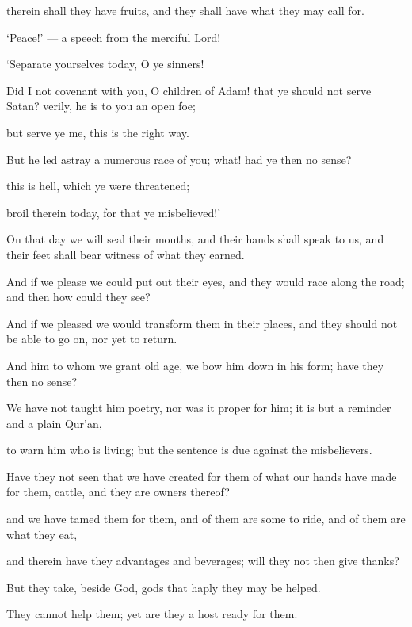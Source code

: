 \documentclass[fontsize=14pt, letterpaper, notitlepage, openany, DIV=12]{scrbook} %
\begin{document}
\noindent[36:57]
therein shall they have fruits, and they shall have what they may call for.

\noindent[36:58]
`Peace!' --- a speech from the merciful Lord!

\noindent[36:59]
`Separate yourselves today, O ye sinners!

\noindent[36:60]
Did I not covenant with you, O children of Adam! that ye should not serve Satan? verily,
he is to you an open foe;

\noindent[36:61]
but serve ye me, this is the right way.

\noindent[36:62]
But he led astray a numerous race of you; what! had ye then no sense?

\noindent[36:63]
this is hell, which ye were threatened;

\noindent[36:64]
broil therein today, for that ye misbelieved!'

\noindent[36:65]
On that day we will seal their mouths, and their hands shall speak to us, and their feet
shall bear witness of what they earned.

\noindent[36:66]
And if we please we could put out their eyes, and they would race along the road; and
then how could they see?

\noindent[36:67]
And if we pleased we would transform them in their places, and they should not be able
to go on, nor yet to return.

\noindent[36:68]
And him to whom we grant old age, we bow him down in his form; have they then no
sense?

\noindent[36:69]
We have not taught him poetry, nor was it proper for him; it is but a reminder and a plain
Qur'an,

\noindent[36:70]
to warn him who is living; but the sentence is due against the misbelievers.

\noindent[36:71]
Have they not seen that we have created for them of what our hands have made for them,
cattle, and they are owners thereof?

\noindent[36:72]
and we have tamed them for them, and of them are some to ride, and of them are what
they eat,

\noindent[36:73]
and therein have they advantages and beverages; will they not then give thanks?

\noindent[36:74]
But they take, beside God, gods that haply they may be helped.

\noindent[36:75]
They cannot help them; yet are they a host ready for them.
\end{document}
